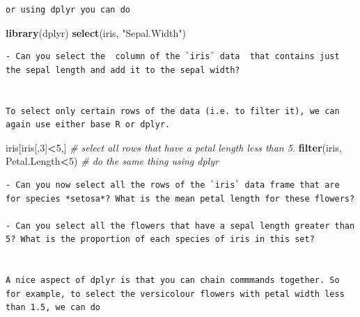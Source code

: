 \documentclass[]{book}
\newenvironment{Shaded}{\begin{snugshade}}{\end{snugshade}}
\newcommand{\CommentTok}[1]{\textcolor[rgb]{0.56,0.35,0.01}{\textit{#1}}}
\newcommand{\DecValTok}[1]{\textcolor[rgb]{0.00,0.00,0.81}{#1}}
\newcommand{\KeywordTok}[1]{\textcolor[rgb]{0.13,0.29,0.53}{\textbf{#1}}}
\newcommand{\NormalTok}[1]{#1}
\newcommand{\OperatorTok}[1]{\textcolor[rgb]{0.81,0.36,0.00}{\textbf{#1}}}
\newcommand{\StringTok}[1]{\textcolor[rgb]{0.31,0.60,0.02}{#1}}
\theoremstyle{definition}
\theoremstyle{definition}
\theoremstyle{definition}
\theoremstyle{remark}
\begin{document}
\begin{Shaded}
\end{Shaded}

\begin{verbatim}
or using dplyr you can do
\end{verbatim}

\begin{Shaded}
\begin{Highlighting}[]
\KeywordTok{library}\NormalTok{(dplyr)}
\KeywordTok{select}\NormalTok{(iris, }\StringTok{"Sepal.Width"}\NormalTok{)}
\end{Highlighting}
\end{Shaded}

\begin{verbatim}
- Can you select the  column of the `iris` data  that contains just the sepal length and add it to the sepal width?


To select only certain rows of the data (i.e. to filter it), we can again use either base R or dplyr.
\end{verbatim}

\begin{Shaded}
\begin{Highlighting}[]
\NormalTok{iris[iris[,}\DecValTok{3}\NormalTok{]}\OperatorTok{<}\DecValTok{5}\NormalTok{,] }\CommentTok{# select all rows that have a petal length less than 5.}
\KeywordTok{filter}\NormalTok{(iris, Petal.Length}\OperatorTok{<}\DecValTok{5}\NormalTok{) }\CommentTok{# do the same thing using dplyr}
\end{Highlighting}
\end{Shaded}

\begin{verbatim}
- Can you now select all the rows of the `iris` data frame that are for species *setosa*? What is the mean petal length for these flowers?

- Can you select all the flowers that have a sepal length greater than 5? What is the proportion of each species of iris in this set?


A nice aspect of dplyr is that you can chain commmands together. So for example, to select the versicolour flowers with petal width less than 1.5, we can do
\end{verbatim}
\end{document}
